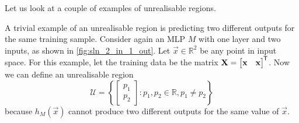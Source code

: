 Let us look at a couple of examples of unrealisable regions.
\begin{example}
    \label{ex:unrealisable_trivial}
    A trivial example of an unrealisable region is predicting two different outputs for the same training sample.
    Consider again an MLP $M$ with one layer and two inputs, as shown in \ref{fig:sln_2_in_1_out}.
    Let $\vec{x}\in \mathbb{R}^2$ be any point in input space.
    For this example, let the training data be the matrix
    $
        \mathbf{X} = \begin{bmatrix}
            \mathbf{x} & \mathbf{x}
        \end{bmatrix}^{\mkern-1.5mu\mathsf{T}}
    $.
    Now we can define an unrealisable region
    \begin{equation*}
        \mathcal{U} = \left\{
            \begin{bmatrix}
                p_1 \\ p_2
            \end{bmatrix} : p_1, p_2 \in \mathbb{R}, p_1 \neq p_2
        \right\}
    \end{equation*}
    because $h_M(\vec{x})$ cannot produce two different outputs for the same value of $\vec{x}$.
\end{example}

